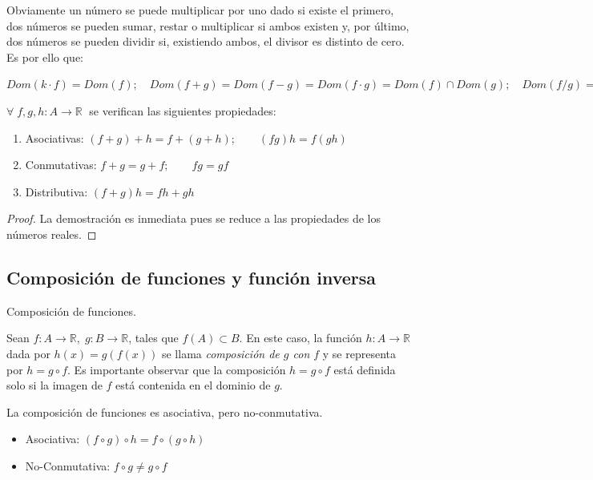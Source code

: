 		Obviamente un número se puede multiplicar por uno dado si existe el primero, dos números se pueden sumar, restar o multiplicar si ambos existen y, por último, dos números se pueden dividir si, existiendo ambos, el divisor es distinto de cero. Es por ello que:
		
		$Dom(k\cdot f)=Dom(f); \quad Dom(f+g)=Dom(f-g)=Dom(f\cdot g)=Dom(f) \cap Dom(g); \quad Dom(f/g)=Dom(f) \cap Dom(g)\sim \{x/g(x)=0 \}$

	\begin{prop} $\forall \; f,g,h : A \to \mathbb R\; $ se verifican las siguientes propiedades:
	
		\begin{enumerate}
			\item Asociativas: $(f+g)+h=f+(g+h); \qquad (fg)h=f(gh) $
			\item Conmutativas: $f+g=g+f; \qquad fg=gf$
			\item Distributiva: $(f+g)h=fh+gh$
		\end{enumerate}
	\end{prop}
	\begin{proof} La demostración es inmediata pues se reduce a las propiedades de los números reales.	
	\end{proof}

	\subsection{Composición de funciones y función inversa}
	
	

	\begin{defi}{Composición de funciones}.
	
	Sean $f:A \to \mathbb R, \; g:B \to \mathbb R$, tales que $f(A) \subset B$. En este caso, la función $h:A \to \mathbb R$ dada por $h(x)=g \left( f(x) \right)$ se llama \emph{composición de $g$ con $f$} y se representa por $h=g \circ f$. Es importante observar que la composición $h=g \circ f$ está definida solo si la imagen de $f$ está contenida en el dominio de $g$.
	
	
	La composición de funciones es asociativa, pero no-conmutativa.
	
	
	\begin{itemize}
		\item Asociativa: $(f \circ g) \circ h =f \circ (g \circ h) $
		\item No-Conmutativa: $f \circ g \neq g \circ f$
	\end{itemize}
		
	\end{defi}
	
